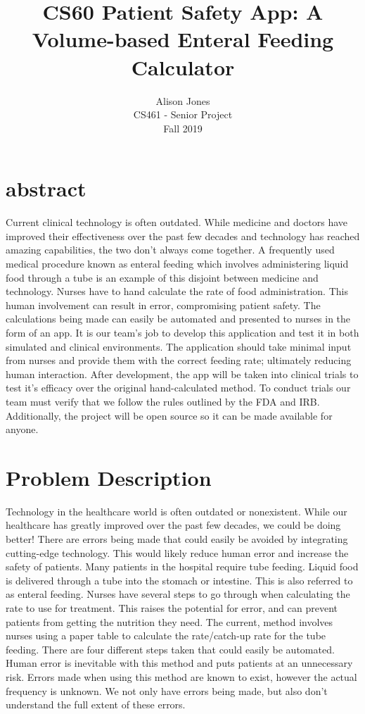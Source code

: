 \documentclass[fullpage,10pt, onecolumn, draftclsnofoot]{IEEEtran}
\title{CS60 Patient Safety App: A Volume-based Enteral Feeding Calculator}
\author{Alison Jones\\ CS461 - Senior Project \\Fall 2019}
\begin{document}
\maketitle

\section{abstract}
Current clinical technology is often outdated. While medicine and doctors have improved their effectiveness over the past few decades and technology has reached amazing capabilities, the two don't always come together. A frequently used medical procedure known as enteral feeding which involves administering liquid food through a tube is an example of this disjoint between medicine and technology. Nurses have to hand calculate the rate of food administration. This human involvement can result in error, compromising patient safety. The calculations being made can easily be automated and presented to nurses in the form of an app. It is our team's job to develop this application and test it in both simulated and clinical environments. The application should take minimal input from nurses and provide them with the correct feeding rate; ultimately reducing human interaction. After development, the app will be taken into clinical trials to test it's efficacy over the original hand-calculated method. To conduct trials our team must verify that we follow the rules outlined by the FDA and IRB. Additionally, the project will be open source so it can be made available for anyone. 

\newpage

\section{Problem Description}
Technology in the healthcare world is often outdated or nonexistent. While our healthcare has greatly improved over the past few decades, we could be doing better! There are errors being made that could easily be avoided by integrating cutting-edge technology. This would likely reduce human error and increase the safety of patients.
\newline Many patients in the hospital require tube feeding. Liquid food is delivered through a tube into the stomach or intestine. This is also referred to as enteral feeding. Nurses have several steps to go through when calculating the rate to use for treatment. This raises the potential for error, and can  prevent patients from getting the nutrition they need. The current, method involves nurses using a paper table to calculate the rate/catch-up rate for the tube feeding. There are four different steps taken that could easily be automated. Human error is inevitable with this method and puts patients at an unnecessary risk. 
\newline Errors made when using this method are known to exist, however the actual frequency is unknown. We not only have errors being made, but also don't understand the full extent of these errors. 
\end{document}

